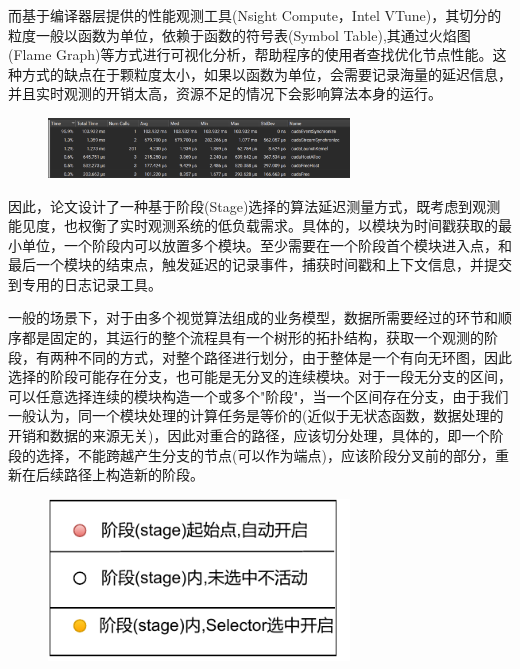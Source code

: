 \documentclass[master]{shtthesis}
\begin{document}
而基于编译器层提供的性能观测工具(Nsight Compute，Intel VTune\cite{reinders2005vtune})，其切分的粒度一般以函数为单位，依赖于函数的符号表(Symbol Table),其通过火焰图(Flame Graph)\cite{gregg2016flame}等方式进行可视化分析，帮助程序的使用者查找优化节点性能。这种方式的缺点在于颗粒度太小，如果以函数为单位，会需要记录海量的延迟信息，并且实时观测的开销太高，资源不足的情况下会影响算法本身的运行。
\begin{figure}[htbp]
	\centering
	\includegraphics[width=8cm]{img/nsight_func.png}
	\label{NsightCompute的观测结果}
\end{figure}


因此，论文设计了一种基于阶段(Stage)选择的算法延迟测量方式，既考虑到观测能见度，也权衡了实时观测系统的低负载需求。具体的，以模块为时间戳获取的最小单位，一个阶段内可以放置多个模块。至少需要在一个阶段首个模块进入点，和最后一个模块的结束点，触发延迟的记录事件，捕获时间戳和上下文信息，并提交到专用的日志记录工具。

一般的场景下，对于由多个视觉算法组成的业务模型，数据所需要经过的环节和顺序都是固定的，其运行的整个流程具有一个树形的拓扑结构，获取一个观测的阶段，有两种不同的方式，对整个路径进行划分，由于整体是一个有向无环图，因此选择的阶段可能存在分支，也可能是无分叉的连续模块。对于一段无分支的区间，可以任意选择连续的模块构造一个或多个"阶段"，当一个区间存在分支，由于我们一般认为，同一个模块处理的计算任务是等价的(近似于无状态函数，数据处理的开销和数据的来源无关)，因此对重合的路径，应该切分处理，具体的，即一个阶段的选择，不能跨越产生分支的节点(可以作为端点)，应该阶段分叉前的部分，重新在后续路径上构造新的阶段。

\begin{figure}[htbp]
	\centering
	\includegraphics[width=8cm]{img/trace_l.pdf}
	\label{论文观测机制示意图图例}
\end{figure}
\end{document}
